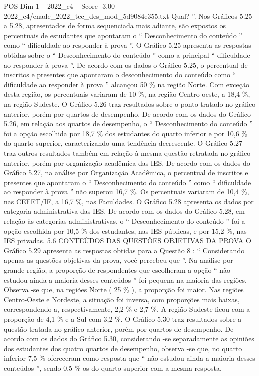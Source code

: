 \begin{textsample}{POS Dim 1 – 2022\_c4 – Score -3.00 – 2022\_c4/enade\_2022\_tec\_des\_mod\_5d9084e355.txt}
Qual? ”.
Nos Gráficos 5.25 a 5.28, apresentados de forma sequenciada mais adiante, são expostos os percentuais de estudantes que apontaram o “ Desconhecimento do conteúdo ” como “ dificuldade ao responder à prova ”.
O Gráfico 5.25 apresenta as respostas obtidas sobre o “ Desconhecimento do conteúdo ” como a principal “ dificuldade ao responder à prova ”.
De acordo com os dados o Gráfico 5.25, o percentual de inscritos e presentes que apontaram o desconhecimento do conteúdo como “ dificuldade ao responder à prova ” alcançou 50 \% na região Norte.
Com exceção desta região, os percentuais variaram de 10 \%, na região Centro-oeste, a 18,4 \%, na região Sudeste.
O Gráfico 5.26 traz resultados sobre o ponto tratado no gráfico anterior, porém por quartos de desempenho.
De acordo com os dados do Gráfico 5.26, em relação aos quartos de desempenho, o “ Desconhecimento do conteúdo ” foi a opção escolhida por 18,7 \% dos estudantes do quarto inferior e por 10,6 \% do quarto superior, caracterizando uma tendência decrescente.
O Gráfico 5.27 traz outros resultados também em relação à mesma questão retratada no gráfico anterior, porém por organização acadêmica das IES.
De acordo com os dados do Gráfico 5.27, na análise por Organização Acadêmica, o percentual de inscritos e presentes que apontaram o “ Desconhecimento do conteúdo ” como “ dificuldade ao responder à prova ” não superou 16,7 \%.
Os percentuais variaram de 10,4 \%, nas CEFET/IF, a 16,7 \%, nas Faculdades.
O Gráfico 5.28 apresenta os dados por categoria administrativa das IES.
De acordo com os dados do Gráfico 5.28, em relação às categorias administrativas, o “ Desconhecimento do conteúdo ” foi a opção escolhida por 10,5 \% dos estudantes, nas IES públicas, e por 15,2 \%, nas IES privadas. 5.6 CONTEÚDOS DAS QUESTÕES OBJETIVAS DA PROVA O Gráfico 5.29 apresenta as respostas obtidas para a Questão 8 : “ Considerando apenas as questões objetivas da prova, você percebeu que ”.
Na análise por grande região, a proporção de respondentes que escolheram a opção “ não estudou ainda a maioria desses conteúdos ” foi pequena na maioria das regiões.
Observa -se que, na regiões Norte ( 25 \% ), a proporção foi maior.
Nas regiões Centro-Oeste e Nordeste, a situação foi inversa, com proporções mais baixas, correspondendo a, respectivamente, 2,2 \% e 2,7 \%.
A região Sudeste ficou com a proporção de 4,1 \% e a Sul com 3,2 \%.
O Gráfico 5.30 traz resultados sobre a questão tratada no gráfico anterior, porém por quartos de desempenho.
De acordo com os dados do Gráfico 5.30, considerando -se separadamente as opiniões dos estudantes dos quatro quartos de desempenho, observa -se que, no quarto inferior 7,5 \% ofereceram como resposta que “ não estudou ainda a maioria desses conteúdos ”, sendo 0,5 \% os do quarto superior com a mesma resposta.

\end{textsample}
